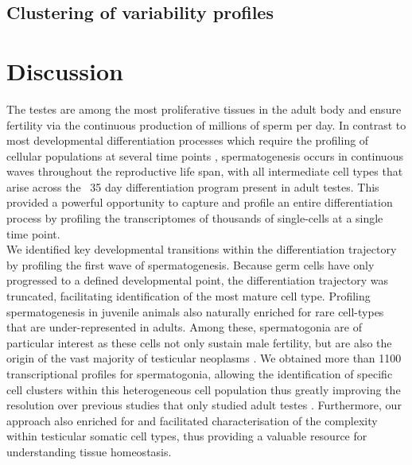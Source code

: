 \subsection{Clustering of variability profiles}


\newpage

\newpage



\section{Discussion}

The testes are among the most proliferative tissues in the adult body and ensure fertility via the continuous production of millions of sperm per day. In contrast to most developmental differentiation processes which require the profiling of cellular populations at several time points \citep{Kernfeld2018, Scialdone2016, Wagner2018}, spermatogenesis occurs in continuous waves throughout the reproductive life span, with all intermediate cell types that arise across the ~35 day differentiation program present in adult testes. This provided a powerful opportunity to capture and profile an entire differentiation process by profiling the transcriptomes of thousands of single-cells at a single time point. \\

We identified key developmental transitions within the differentiation trajectory by profiling the first wave of spermatogenesis. Because germ cells have only progressed to a defined developmental point, the differentiation trajectory was truncated, facilitating identification of the most mature cell type. Profiling spermatogenesis in juvenile animals also naturally enriched for rare cell-types that are under-represented in adults. Among these, spermatogonia are of particular interest as these cells not only sustain male fertility, but are also the origin of the vast majority of testicular neoplasms \citep{Bosl1997}. We obtained more than 1100 transcriptional profiles for spermatogonia, allowing the identification of specific cell clusters within this heterogeneous cell population thus greatly improving the resolution over previous studies that only studied adult testes \citep{Lukassen2018}. Furthermore, our approach also enriched for and facilitated characterisation of the complexity within testicular somatic cell types, thus providing a valuable resource for understanding tissue homeostasis.\\

